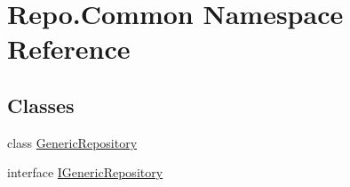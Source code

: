 \hypertarget{namespace_repo_1_1_common}{}\section{Repo.\+Common Namespace Reference}
\label{namespace_repo_1_1_common}
\subsection*{Classes}
\begin{DoxyCompactItemize}
\item 
class \hyperlink{class_repo_1_1_common_1_1_generic_repository}{Generic\+Repository}
\item 
interface \hyperlink{interface_repo_1_1_common_1_1_i_generic_repository}{I\+Generic\+Repository}
\end{DoxyCompactItemize}
